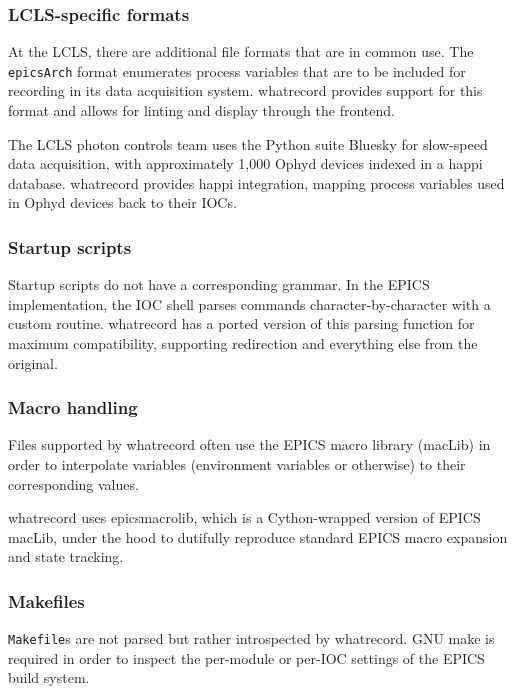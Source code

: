 \documentclass[letter,
               keeplastbox,   %
               ]{jacow}
\begin{document}
\subsubsection{LCLS-specific formats}

At the LCLS, there are additional file formats that are in common use.
The \verb_epicsArch_ format enumerates process variables that are to be
included for recording in its data acquisition system.  whatrecord provides
support for this format and allows for linting and display through the
frontend.

The LCLS photon controls team uses the Python suite Bluesky\cite{bluesky} for
slow-speed data acquisition, with approximately 1,000 Ophyd devices indexed in
a happi\cite{happi} database.  whatrecord provides happi integration, mapping
process variables used in Ophyd devices back to their IOCs.

\subsubsection{Startup scripts}

Startup scripts do not have a corresponding grammar. In the EPICS
implementation, the IOC shell parses commands character-by-character with a
custom routine.  whatrecord has a ported version of this parsing function
for maximum compatibility, supporting redirection and everything else from the
original.

\subsubsection{Macro handling}

Files supported by whatrecord often use the EPICS macro library (macLib)
in order to interpolate variables (environment variables or otherwise) to their
corresponding values.

whatrecord uses epicsmacrolib\cite{epicsmacrolib}, which is a Cython-wrapped
version of EPICS macLib, under the hood to dutifully reproduce standard EPICS
macro expansion and state tracking.

\subsubsection{Makefiles}

\verb_Makefile_s are not parsed but rather introspected by whatrecord.  GNU
make is required in order to inspect the per-module or per-IOC settings of the
EPICS build system.
\end{document}

